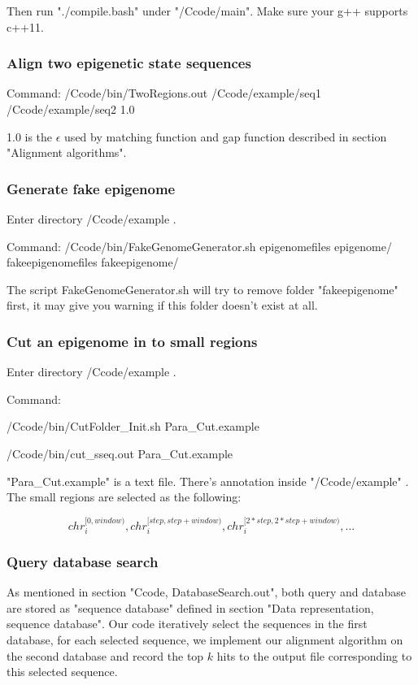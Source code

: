 \documentclass[a4paper]{article}
\begin{document}
\begin{CJK*}{UTF8}{kai}
Then run "./compile.bash" under "/Ccode/main". Make sure your g++ supports c++11.

\subsubsection{Align two epigenetic state sequences}

Command: /Ccode/bin/TwoRegions.out /Ccode/example/seq1 /Ccode/example/seq2 1.0

1.0 is the $\epsilon$ used by matching function and gap function described in section "Alignment algorithms".

\subsubsection{Generate fake epigenome}
 
Enter directory /Ccode/example .

Command: /Ccode/bin/FakeGenomeGenerator.sh epigenomefiles epigenome/ fakeepigenomefiles fakeepigenome/

The script FakeGenomeGenerator.sh will try to remove folder "fakeepigenome" first, it may give you warning if this folder doesn't exist at all.

\subsubsection{Cut an epigenome in to small regions}

Enter directory /Ccode/example .

Command: 

/Ccode/bin/CutFolder\_Init.sh Para\_Cut.example

/Ccode/bin/cut\_sseq.out Para\_Cut.example

"Para\_Cut.example" is a text file. There's annotation inside "/Ccode/example" . The small regions are selected as the following:

$$chr_i^{[0,window)}, chr_i^{[step,step+window)}, chr_i^{[2*step,2*step+window)},...$$

\subsubsection{Query database search}

As mentioned in section "Ccode, DatabaseSearch.out", both query and database are stored as "sequence database" defined in section "Data representation, sequence database". Our code iteratively select the sequences in the first database, for each selected sequence, we implement our alignment algorithm on the second database and record the top $k$ hits to the output file corresponding to this selected sequence.


\end{CJK*}
\end{document}

